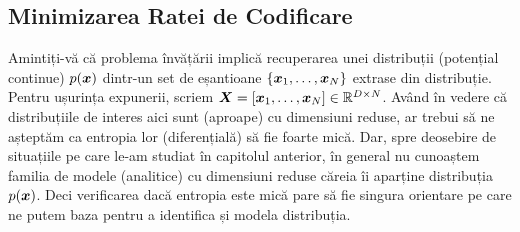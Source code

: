 \documentclass[../../book-main_ro.tex]{subfiles}
\begin{document}
\subsection{Minimizarea Ratei de Codificare}\label{sub:min_entropy}
Amintiți-vă că problema învățării implică recuperarea unei distribuții (potențial continue) $p(\bm{x})$ dintr-un set de eșantioane $\{\bm{x}_1, \ldots, \bm{x}_N\}$ extrase din distribuție. Pentru ușurința expunerii, scriem $\bm{X} = [\bm{x}_1, \ldots, \bm{x}_N] \in \mathbb{R}^{D\times N}$. Având în vedere că distribuțiile de interes aici sunt (aproape) cu dimensiuni reduse, ar trebui să ne așteptăm ca entropia lor (diferențială) să fie foarte mică. Dar, spre deosebire de situațiile pe care le-am studiat în capitolul anterior, în general nu cunoaștem familia de modele (analitice) cu dimensiuni reduse căreia îi aparține distribuția $p(\bm{x})$. Deci verificarea dacă entropia este mică pare să fie singura orientare pe care ne putem baza pentru a identifica și modela distribuția.
\end{document}
